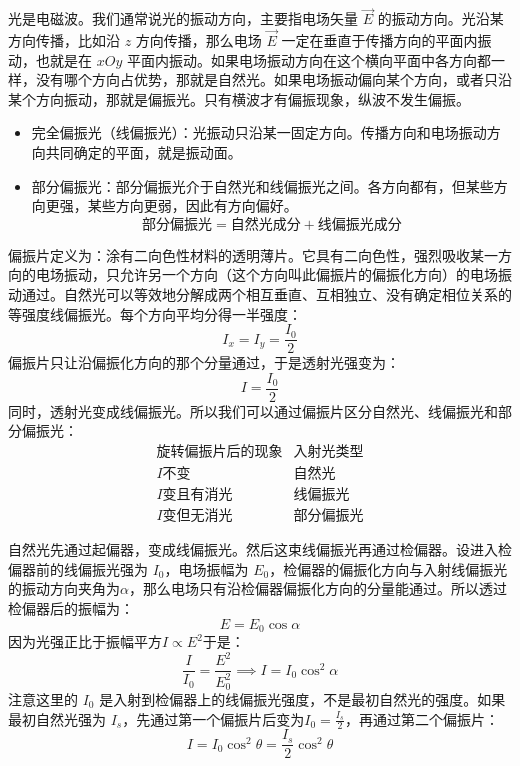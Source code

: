 \documentclass[lang=cn,11pt]{elegantbook}
\begin{document}
\begin{definition}[偏振（Polarization）]
    光是电磁波。我们通常说光的振动方向，主要指电场矢量 \(\vec E\) 的振动方向。光沿某方向传播，比如沿 \(z\) 方向传播，那么电场 \(\vec E\) 一定在垂直于传播方向的平面内振动，也就是在 \(xOy\) 平面内振动。如果电场振动方向在这个横向平面中各方向都一样，没有哪个方向占优势，那就是自然光。如果电场振动偏向某个方向，或者只沿某个方向振动，那就是偏振光。只有横波才有偏振现象，纵波不发生偏振。
    \begin{itemize}
    \item 完全偏振光（线偏振光）：光振动只沿某一固定方向。传播方向和电场振动方向共同确定的平面，就是振动面。
    \item 部分偏振光：部分偏振光介于自然光和线偏振光之间。各方向都有，但某些方向更强，某些方向更弱，因此有方向偏好。
\[
\boxed{\text{部分偏振光}=\text{自然光成分}+\text{线偏振光成分}}
\]
    \end{itemize}
\end{definition}

\begin{definition}
    偏振片定义为：涂有二向色性材料的透明薄片。它具有二向色性，强烈吸收某一方向的电场振动，只允许另一个方向（这个方向叫此偏振片的偏振化方向）的电场振动通过。自然光可以等效地分解成两个相互垂直、互相独立、没有确定相位关系的等强度线偏振光。每个方向平均分得一半强度：
\[
I_x=I_y=\frac{I_0}{2}
\]偏振片只让沿偏振化方向的那个分量通过，于是透射光强变为：
\[
I=\frac{I_0}{2}
\]同时，透射光变成线偏振光。所以我们可以通过偏振片区分自然光、线偏振光和部分偏振光：
\[
\begin{array}{c|c}
\text{旋转偏振片后的现象} & \text{入射光类型}\\
\hline
I\text{不变} & \text{自然光}\\
I\text{变且有消光} & \text{线偏振光}\\
I\text{变但无消光} & \text{部分偏振光}
\end{array}
\]
\end{definition}

\begin{theorem}
自然光先通过起偏器，变成线偏振光。然后这束线偏振光再通过检偏器。设进入检偏器前的线偏振光强为 \(I_0\)，电场振幅为 \(E_0\)，检偏器的偏振化方向与入射线偏振光的振动方向夹角为\(\alpha\)，那么电场只有沿检偏器偏振化方向的分量能通过。所以透过检偏器后的振幅为：
\[
E=E_0\cos\alpha
\]因为光强正比于振幅平方\(I\propto E^2\)于是：
\[
\frac{I}{I_0}=\frac{E^2}{E_0^2}\implies I=I_0\cos^2\alpha
\]注意这里的 \(I_0\) 是入射到检偏器上的线偏振光强度，不是最初自然光的强度。如果最初自然光强为 \(I_s\)，先通过第一个偏振片后变为\(I_0=\frac{I_s}{2}\)，再通过第二个偏振片：
\[
I=I_0\cos^2\theta=\frac{I_s}{2}\cos^2\theta
\]
\end{theorem}
\end{document}
